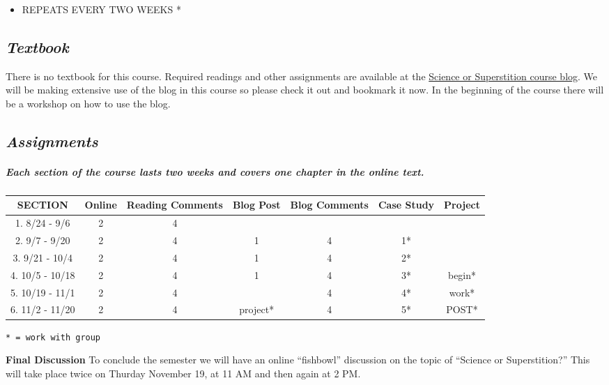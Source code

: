 \documentclass[
]{article}
\providecommand{\tightlist}{%
  \setlength{\itemsep}{0pt}\setlength{\parskip}{0pt}}
\begin{document}
\begin{infobox}
\begin{itemize}
\tightlist
\item
  REPEATS EVERY TWO WEEKS *
\end{itemize}

\end{infobox}

\hypertarget{textbook}{%
\subsection{\texorpdfstring{\emph{Textbook}}{Textbook}}\label{textbook}}

\begin{note}

There is no textbook for this course. Required readings and other
assignments are available at the
\href{https://www.6worlds.net/science-blog/}{Science or Superstition
course blog}. We will be making extensive use of the blog in this course
so please check it out and bookmark it now. In the beginning of the
course there will be a workshop on how to use the blog.

\end{note}

\hypertarget{assignments}{%
\subsection{\texorpdfstring{\emph{Assignments}}{Assignments}}\label{assignments}}

\begin{infobox}

\hypertarget{each-section-of-the-course-lasts-two-weeks-and-covers-one-chapter-in-the-online-text.}{%
\subparagraph{\texorpdfstring{Each \textbf{section} of the course lasts
\textbf{two weeks} and covers one chapter in the online
text.}{Each section of the course lasts two weeks and covers one chapter in the online text.}}\label{each-section-of-the-course-lasts-two-weeks-and-covers-one-chapter-in-the-online-text.}}

\begin{longtable}[]{@{}ccccccc@{}}
\toprule
SECTION & Online & Reading Comments & Blog Post & Blog Comments & Case
Study & Project\tabularnewline
\midrule
\endhead
1. 8/24 - 9/6 & 2 & 4 & & & &\tabularnewline
2. 9/7 - 9/20 & 2 & 4 & 1 & 4 & 1* &\tabularnewline
3. 9/21 - 10/4 & 2 & 4 & 1 & 4 & 2* &\tabularnewline
4. 10/5 - 10/18 & 2 & 4 & 1 & 4 & 3* & begin*\tabularnewline
5. 10/19 - 11/1 & 2 & 4 & & 4 & 4* & work*\tabularnewline
6. 11/2 - 11/20 & 2 & 4 & project* & 4 & 5* & POST*\tabularnewline
\bottomrule
\end{longtable}

\texttt{*\ =\ work\ with\ group}

\textbf{Final Discussion} To conclude the semester we will have an
online ``fishbowl'' discussion on the topic of ``Science or
Superstition?'' This will take place twice on Thurday November 19, at 11
AM and then again at 2 PM.

\end{infobox}
\end{document}

